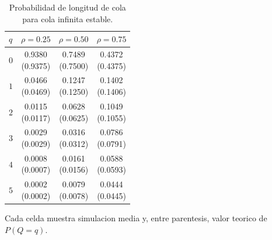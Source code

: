 \begin{table}[htbp]
\centering
\caption{Probabilidad de longitud de cola para cola infinita estable.}
\label{tab:mm1-queue-probabilities}
\begin{tabular}{lccc}
\toprule
$q$ & $\rho=0.25$ & $\rho=0.50$ & $\rho=0.75$ \\
\midrule
$0$ & \shortstack{0.9380\\(0.9375)} & \shortstack{0.7489\\(0.7500)} & \shortstack{0.4372\\(0.4375)} \\
$1$ & \shortstack{0.0466\\(0.0469)} & \shortstack{0.1247\\(0.1250)} & \shortstack{0.1402\\(0.1406)} \\
$2$ & \shortstack{0.0115\\(0.0117)} & \shortstack{0.0628\\(0.0625)} & \shortstack{0.1049\\(0.1055)} \\
$3$ & \shortstack{0.0029\\(0.0029)} & \shortstack{0.0316\\(0.0312)} & \shortstack{0.0786\\(0.0791)} \\
$4$ & \shortstack{0.0008\\(0.0007)} & \shortstack{0.0161\\(0.0156)} & \shortstack{0.0588\\(0.0593)} \\
$5$ & \shortstack{0.0002\\(0.0002)} & \shortstack{0.0079\\(0.0078)} & \shortstack{0.0444\\(0.0445)} \\
\bottomrule
\end{tabular}
\par\smallskip
\begin{minipage}{0.95\linewidth}
\centering\footnotesize
Cada celda muestra simulacion media y, entre parentesis, valor teorico de $P(Q=q)$.
\end{minipage}
\end{table}
